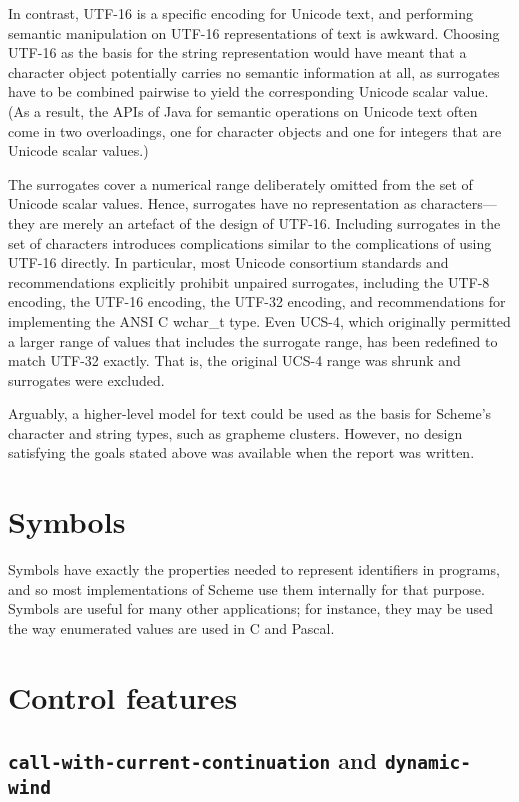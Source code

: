 \documentclass[twoside,twocolumn]{algol60}
\begin{document}
In contrast, UTF-16 is a specific encoding for Unicode text, and
performing semantic manipulation on UTF-16 representations of text is
awkward.  Choosing UTF-16 as the basis for the string representation
would have meant that a character object potentially carries no
semantic information at all, as surrogates have to be combined
pairwise to yield the corresponding Unicode scalar value.  (As a
result, the APIs of Java for semantic operations on Unicode text often
come in two overloadings, one for character objects and one for
integers that are Unicode scalar values.)

The surrogates cover a numerical range deliberately omitted from the
set of Unicode scalar values.  Hence, surrogates have no
representation as characters---they are merely an artefact of the
design of UTF-16.  Including surrogates in the set of characters
introduces complications similar to the complications of using UTF-16
directly.  In particular, most Unicode consortium standards and
recommendations explicitly prohibit unpaired surrogates, including the
UTF-8 encoding, the UTF-16 encoding, the UTF-32 encoding, and
recommendations for implementing the ANSI C {\cf wchar\_t} type.  Even
UCS-4, which originally permitted a larger range of values that
includes the surrogate range, has been redefined to match UTF-32
exactly. That is, the original UCS-4 range was shrunk and surrogates
were excluded.

Arguably, a higher-level model for text could be used as the basis for
Scheme's character and string types, such as grapheme clusters.
However, no design satisfying the goals stated above was available
when the report was written.

\section{Symbols}

Symbols have exactly the properties needed to represent
identifiers in programs, and so most implementations
of Scheme use them internally for that purpose.  Symbols are useful
for many other applications; for instance, they may be used the way
enumerated values are used in C and Pascal.

\section{Control features}

\subsection{{\tt call-with-current-continuation} and {\tt dynamic-wind}}
\end{document}

